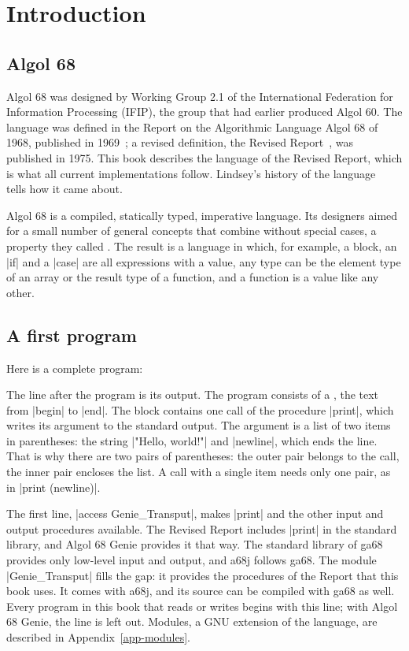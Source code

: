 \chapter{Introduction}\label{ch-intro}

\section{Algol 68}

Algol 68 was designed by Working Group 2.1 of the International Federation
for Information Processing (IFIP), the group that had earlier produced
Algol 60. The language was defined in the Report on the Algorithmic
Language Algol 68 of 1968, published in 1969~\cite{report69}; a revised definition, the
Revised Report~\cite{rr}, was published in 1975. This book describes the
language of the Revised Report, which is what all current implementations
follow. Lindsey's history of the language~\cite{history} tells how it
came about.

Algol 68 is a compiled, statically typed, imperative language. Its
designers aimed for a small number of general concepts that combine
without special cases, a property they called . The
result is a language in which, for example, a block, an \code|if| and a
\code|case| are all expressions with a value, any type can be the element
type of an array or the result type of a function, and a function is a
value like any other.

\section{A first program}

Here is a complete program:


The line after the program is its output. The program consists of a
, the text from \code|begin| to \code|end|. The block contains
one call of the procedure \code|print|, which writes its argument to the
standard output. The argument is a list of two items in parentheses: the
string \code|"Hello, world!"| and \code|newline|, which ends the line.
That is why there are two pairs of parentheses: the outer pair belongs to
the call, the inner pair encloses the list. A call with a single item
needs only one pair, as in \code|print (newline)|.

The first line, \code|access Genie_Transput|, makes \code|print| and the
other input and output procedures available. The Revised Report includes
\code|print| in the standard library, and Algol 68 Genie provides it that
way. The standard library of ga68 provides only low-level input and
output, and a68j follows ga68. The module \code|Genie_Transput| fills the
gap: it provides the procedures of the Report that this book uses. It
comes with a68j, and its source can be compiled with ga68 as well. Every
program in this book that reads or writes begins with this line; with
Algol 68 Genie, the line is left out. Modules, a GNU extension of the
language, are described in Appendix~\ref{app-modules}.

